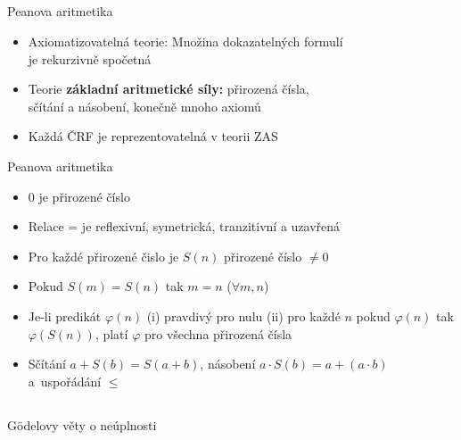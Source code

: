 \documentclass{beamer}
\begin{document}
\subsection{}
\begin{frame}{Peanova aritmetika}
\begin{itemize}
\item Axiomatizovatelná teorie: Množina dokazatelných formulí \\ je rekurzivně spočetná
\item Teorie {\bf základní aritmetické síly:} přirozená čísla, \\ sčítání a násobení, konečně mnoho axiomů
\item Každá ČRF je reprezentovatelná v teorii ZAS
\end{itemize}
\begin{block}{Peanova aritmetika}
\begin{itemize}
\item 0 je přirozené číslo
\item Relace = je reflexivní, symetrická, tranzitivní a uzavřená
\item Pro každé přirozené čislo je $S(n)$ přirozené číslo $\ne 0$
\item Pokud $S(m) = S(n)$ tak $m=n$ ($\forall m,n$)
\item Je-li predikát $\varphi(n)$ (i) pravdivý pro nulu (ii) pro každé $n$ pokud $\varphi(n)$ tak $\varphi(S(n))$, platí $\varphi$ pro všechna přirozená čísla
\item Sčítání $a+S(b)=S(a+b)$, násobení $a\cdot S(b) = a + (a\cdot b)$ a~uspořádání $\le$
\end{itemize}
\end{block}
\end{frame}

\subsection{}
\begin{frame}{Gödelovy věty o neúplnosti}
\end{frame}
\end{document}
